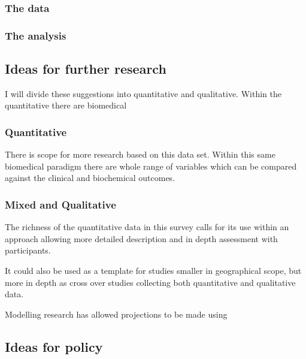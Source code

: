 \documentclass[
]{article}
\begin{document}
\hypertarget{the-data}{%
\subsubsection{The data}\label{the-data}}

\hypertarget{the-analysis}{%
\subsubsection{The analysis}\label{the-analysis}}

\hypertarget{ideas-for-further-research}{%
\subsection{Ideas for further
research}\label{ideas-for-further-research}}

I will divide these suggestions into quantitative and qualitative.
Within the quantitative there are biomedical

\hypertarget{quantitative}{%
\subsubsection{Quantitative}\label{quantitative}}

There is scope for more research based on this data set. Within this
same biomedical paradigm there are whole range of variables which can be
compared against the clinical and biochemical outcomes.

\hypertarget{mixed-and-qualitative}{%
\subsubsection{Mixed and Qualitative}\label{mixed-and-qualitative}}

The richness of the quantitative data in this survey calls for its use
within an approach allowing more detailed description and in depth
assessment with participants.

It could also be used as a template for studies smaller in geographical
scope, but more in depth as cross over studies collecting both
quantitative and qualitative data.

Modelling research has allowed projections to be made using

\hypertarget{ideas-for-policy}{%
\subsection{Ideas for policy}\label{ideas-for-policy}}
\end{document}
